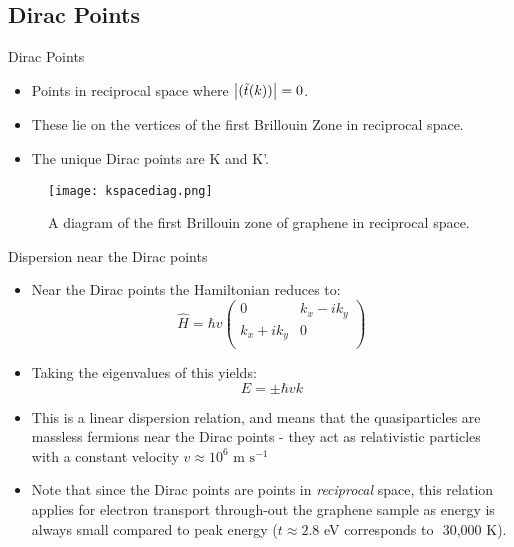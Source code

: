 \documentclass{beamer}
\begin{document}
\subsection{Dirac Points}
\begin{frame}[t]{Dirac Points}
\begin{itemize}
\item Points in reciprocal space where  $\left | (\tilde t(k))\right | =0$.
\item These lie on the vertices of the first Brillouin Zone in reciprocal space.
\item The unique Dirac points are K and K'.
\end{itemize}
\begin{figure}[c]
\texttt{[image: kspacediag.png]}
\caption{A diagram of the first Brillouin zone of graphene in reciprocal space.}
\end{figure}
\end{frame}

\begin{frame}[t]{Dispersion near the Dirac points}
\begin{itemize}
\item Near the Dirac points the Hamiltonian reduces to:
\begin{equation} \hat{H} = \hbar v \left ( \begin{array}{cc}
0 & k_x - ik_y \\
k_x + ik_y & 0\\
\end{array} \right )
\end{equation}
\item Taking the eigenvalues of this yields:
\begin{equation}
E = \pm \hbar v k
\end{equation}
\item This is a linear dispersion relation, and means that the quasiparticles are massless fermions near the Dirac points - they act as relativistic particles with a constant velocity $v \approx 10^6 \text { m s}^{-1}$
\item Note that since the Dirac points are points in \emph{reciprocal} space, this relation applies for electron transport through-out the graphene sample as energy is always small compared to peak energy ($t\approx 2.8$ eV corresponds to $\urltilde$30,000 K).
\end{itemize}
\end{frame}
\end{document}
